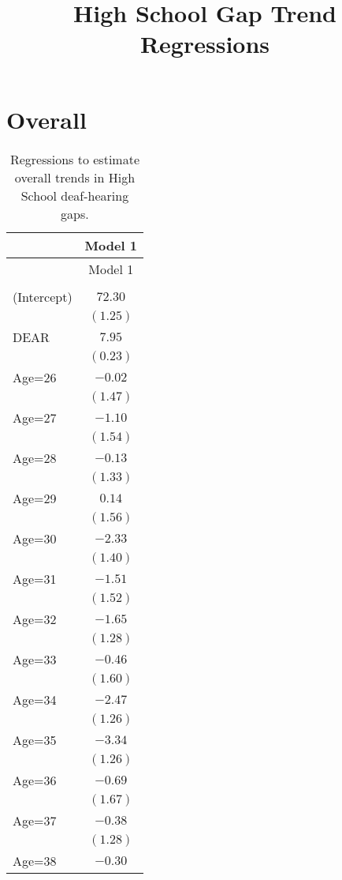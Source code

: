 \documentclass[fullpage]{paper}
\title{ High School Gap Trend Regressions}
\begin{document}
\section{Overall}

\begin{center}
\begin{longtable}{l c }
\hline
 & Model 1 \\
\hline
\endfirsthead
\hline
 & Model 1 \\
\hline
\endhead
\hline
\endfoot
\hline
\multicolumn{2}{l}{\scriptsize{}}\\
\caption{Regressions to estimate overall trends in High School deaf-hearing gaps.}
\label{table:coefficients}
\endlastfoot
(Intercept) & $72.30$  \\
            & $(1.25)$ \\
DEAR        & $7.95$   \\
            & $(0.23)$ \\
Age=26      & $-0.02$  \\
            & $(1.47)$ \\
Age=27      & $-1.10$  \\
            & $(1.54)$ \\
Age=28      & $-0.13$  \\
            & $(1.33)$ \\
Age=29      & $0.14$   \\
            & $(1.56)$ \\
Age=30      & $-2.33$  \\
            & $(1.40)$ \\
Age=31      & $-1.51$  \\
            & $(1.52)$ \\
Age=32      & $-1.65$  \\
            & $(1.28)$ \\
Age=33      & $-0.46$  \\
            & $(1.60)$ \\
Age=34      & $-2.47$  \\
            & $(1.26)$ \\
Age=35      & $-3.34$  \\
            & $(1.26)$ \\
Age=36      & $-0.69$  \\
            & $(1.67)$ \\
Age=37      & $-0.38$  \\
            & $(1.28)$ \\
Age=38      & $-0.30$  \\

\end{longtable}
\end{center}
\end{document}
